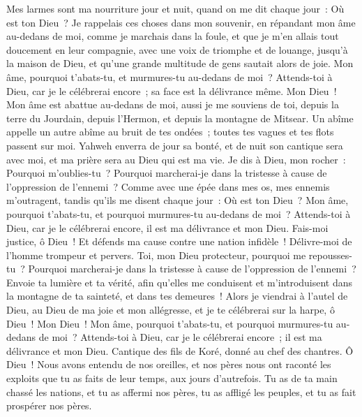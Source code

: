 \begin{multicols}{2}
Mes larmes sont ma nourriture jour et nuit, quand on me dit chaque jour~: Où est ton Dieu~?
Je rappelais ces choses dans mon souvenir, en répandant mon âme au-dedans de moi, comme je marchais dans la foule, et que je m'en allais tout doucement en leur compagnie, avec une voix de triomphe et de louange, jusqu'à la maison de Dieu, et qu'une grande multitude de gens sautait alors de joie.
Mon âme, pourquoi t'abats-tu, et murmures-tu au-dedans de moi~? Attends-toi à Dieu, car je le célébrerai encore~; sa face est la délivrance même.
Mon Dieu~! Mon âme est abattue au-dedans de moi, aussi je me souviens de toi, depuis la terre du Jourdain, depuis l'Hermon, et depuis la montagne de Mitsear.
Un abîme appelle un autre abîme au bruit de tes ondées~; toutes tes vagues et tes flots passent sur moi.
Yahweh enverra de jour sa bonté, et de nuit son cantique sera avec moi, et ma prière sera au Dieu qui est ma vie.
Je dis à Dieu, mon rocher~: Pourquoi m'oublies-tu~? Pourquoi marcherai-je dans la tristesse à cause de l'oppression de l'ennemi~?
Comme avec une épée dans mes os, mes ennemis m'outragent, tandis qu'ils me disent chaque jour~: Où est ton Dieu~?
Mon âme, pourquoi t'abats-tu, et pourquoi murmures-tu au-dedans de moi~? Attends-toi à Dieu, car je le célébrerai encore, il est ma délivrance et mon Dieu.
\VerseOne{}Fais-moi justice, ô Dieu~! Et défends ma cause contre une nation infidèle~! Délivre-moi de l'homme trompeur et pervers.
Toi, mon Dieu protecteur, pourquoi me repousses-tu~? Pourquoi marcherai-je dans la tristesse à cause de l'oppression de l'ennemi~?
Envoie ta lumière et ta vérité, afin qu'elles me conduisent et m'introduisent dans la montagne de ta sainteté, et dans tes demeures~!
Alors je viendrai à l'autel de Dieu, au Dieu de ma joie et mon allégresse, et je te célébrerai sur la harpe, ô Dieu~! Mon Dieu~!
Mon âme, pourquoi t'abats-tu, et pourquoi murmures-tu au-dedans de moi~? Attends-toi à Dieu, car je le célébrerai encore~; il est ma délivrance et mon Dieu.
\VerseOne{}Cantique des fils de Koré, donné au chef des chantres.
Ô Dieu~! Nous avons entendu de nos oreilles, et nos pères nous ont raconté les exploits que tu as faits de leur temps, aux jours d'autrefois.
Tu as de ta main chassé les nations, et tu as affermi nos pères, tu as affligé les peuples, et tu as fait prospérer nos pères.

\end{multicols}
